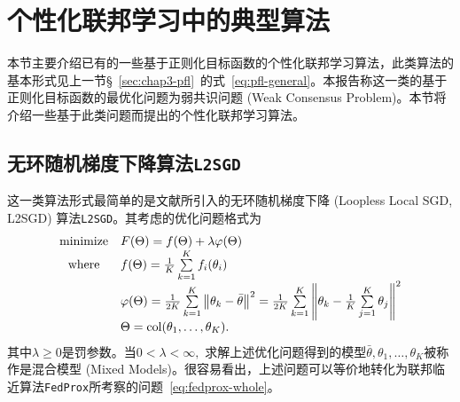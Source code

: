 \section{个性化联邦学习中的典型算法}
\label{sec:chap3-pfl-algo}


本节主要介绍已有的一些基于正则化目标函数的个性化联邦学习算法，此类算法的基本形式见上一节\S~\ref{sec:chap3-pfl}~的式~\eqref{eq:pfl-general}。本报告称这一类的基于正则化目标函数的最优化问题为弱共识问题 (Weak Consensus Problem)。本节将介绍一些基于此类问题而提出的个性化联邦学习算法。

\subsection*{无环随机梯度下降算法\texttt{L2SGD}}

这一类算法形式最简单的是文献\cite{hanzely2020federated}所引入的无环随机梯度下降 (Loopless Local SGD, L2SGD) 算法\texttt{L2SGD}。其考虑的优化问题格式为
\begin{equation}
\label{eq:l2sgd}
\begin{array}{cl}
\operatorname*{minimize} & F(\Theta) = f(\Theta) + \lambda \varphi(\Theta) \\
\text{where} & f(\Theta) = \frac{1}{K} \sum\limits_{k=1}^K f_i(\theta_i) \\
& \varphi(\Theta) = \frac{1}{2K} \sum\limits_{k=1}^K \left\lVert \theta_k - \bar{\theta} \right\rVert^2 = \frac{1}{2K} \sum\limits_{k=1}^K \left\lVert \theta_k - \frac{1}{K} \sum\limits_{j=1}^K \theta_j \right\rVert^2 \\
& \Theta = \operatorname{col}(\theta_1, \ldots, \theta_K).
\end{array}
\end{equation}
其中$\lambda \geqslant 0$是罚参数。当$0 < \lambda < \infty,$ 求解上述优化问题得到的模型$\bar{\theta}, \theta_1, \ldots, \theta_K$被称作是混合模型 (Mixed Models)。很容易看出，上述问题可以等价地转化为联邦临近算法\texttt{FedProx}所考察的问题~\eqref{eq:fedprox-whole}。




